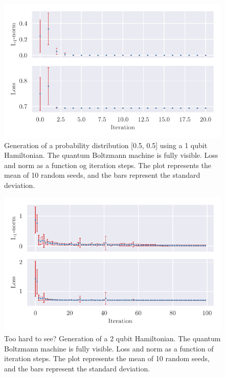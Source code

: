 \documentclass[../main.tex]{subfiles}
\begin{document}
\begin{figure}[h]
    \begin{center}
        \includegraphics{figures/H1_ab_sub_10seeds.pdf}
        \caption{Generation of a probability distribution [0.5, 0.5] using a 1 qubit Hamiltonian. The quantum Boltzmann machine is fully visible. Loss and norm as a function og iteration steps. The plot represents the mean of 10 random seeds, and the bars represent the standard deviation.}
        \label{fig:nolabel}
    \end{center}
\end{figure}

\begin{figure}[h]
    \begin{center}
        \includegraphics{figures/H2_ab_sub_10seeds.pdf}
        \caption{Too hard to see? Generation of a 2 qubit Hamiltonian. The quantum Boltzmann machine is fully visible. Loss and norm as a function of iteration steps. The plot represents the mean of 10 random seeds, and the bars represent the standard deviation.}
        \label{fig:nolabel}
    \end{center}
\end{figure}
\end{document}
